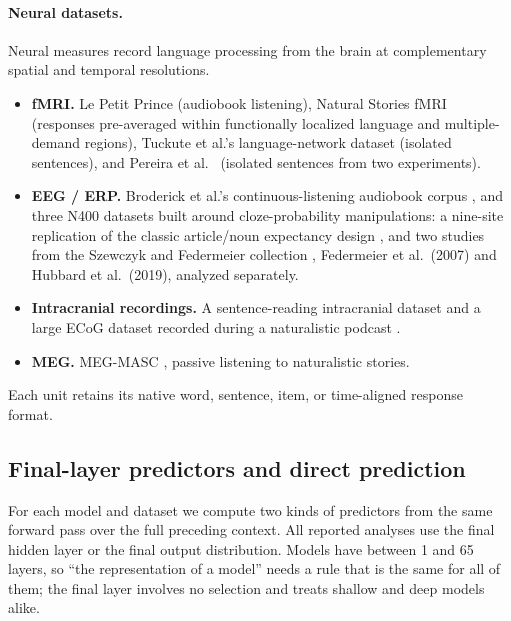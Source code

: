 \paragraph{Neural datasets.}
Neural measures record language processing from the brain at complementary spatial and temporal resolutions.
\begin{itemize}
    \item \textbf{fMRI.} Le Petit Prince \citep{li2022lepetitprince} (audiobook listening), Natural Stories fMRI \citep{shain2022robust} (responses pre-averaged within functionally localized language and multiple-demand regions), Tuckute et al.'s language-network dataset \citep{tuckute2024driving} (isolated sentences), and Pereira et al.\ \citep{pereira2018toward} (isolated sentences from two experiments).
    \item \textbf{EEG / ERP.} Broderick et al.'s continuous-listening audiobook corpus \citep{broderick2018electrophysiological}, and three N400 datasets built around cloze-probability manipulations: a nine-site replication of the classic article/noun expectancy design \citep{nieuwland2018largescale}, and two studies from the Szewczyk and Federmeier collection \citep{szewczyk2022context}, Federmeier et al.\ (2007) \citep{federmeier2007multiple} and Hubbard et al.\ (2019), analyzed separately.
    \item \textbf{Intracranial recordings.} A sentence-reading intracranial dataset \citep{fedorenko2016neural} and a large ECoG dataset recorded during a naturalistic podcast \citep{zada2025podcast}.
    \item \textbf{MEG.} MEG-MASC \citep{gwilliams2022neural}, passive listening to naturalistic stories.
\end{itemize}
Each unit retains its native word, sentence, item, or time-aligned response format.

\subsection{Final-layer predictors and direct prediction}
\label{sec:design-tracks}

For each model and dataset we compute two kinds of predictors from the same forward pass over the full preceding context. All reported analyses use the final hidden layer or the final output distribution. Models have between 1 and 65 layers, so ``the representation of a model'' needs a rule that is the same for all of them; the final layer involves no selection and treats shallow and deep models alike.

